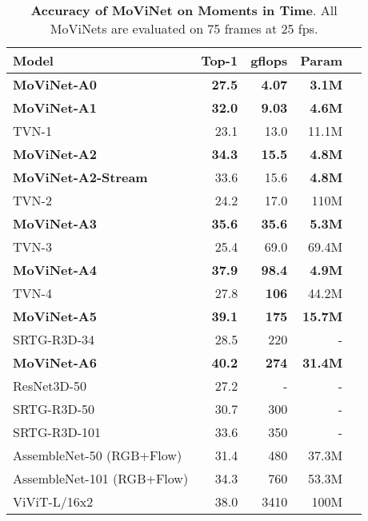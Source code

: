 \documentclass[final]{cvpr}
\newcommand{\ournet}{MoViNet\xspace} \newcommand{\ournets}{\ournet{}s\xspace}
\begin{document}
\begin{table}[tbp]
    \footnotesize
    \begin{center}
    \begin{tabularx}{\columnwidth}{@{}Xrrrr@{}}
    \toprule
        \sc Model & \sc Top-1 & \sc gflops & \sc Param \\
    \midrule
        \bf \ournet-A0 & \bf 27.5 & \bf 4.07 & \bf 3.1M \\
    \midrule
        \bf \ournet-A1 & \bf 32.0 & \bf 9.03 & \bf 4.6M \\
        TVN-1 \cite{piergiovanni2020tiny} & 23.1 & 13.0 & 11.1M \\
    \midrule
        \bf \ournet-A2 & \bf 34.3 & \bf 15.5 & \bf 4.8M \\
        \bf \ournet-A2-Stream & 33.6 & 15.6 & \bf 4.8M \\
        TVN-2 \cite{piergiovanni2020tiny} & 24.2 & 17.0 & 110M \\
    \midrule
        \bf \ournet-A3 & \bf 35.6 & \bf 35.6 & \bf 5.3M \\
        TVN-3 \cite{piergiovanni2020tiny} & 25.4 & 69.0 & 69.4M \\
    \midrule
        \bf \ournet-A4 & \bf 37.9 & \bf 98.4 & \bf 4.9M \\
        TVN-4 \cite{piergiovanni2020tiny} & 27.8 & \bf 106 & 44.2M \\
    \midrule
        \bf \ournet-A5 & \bf 39.1 & \bf 175 & \bf 15.7M \\
        SRTG-R3D-34 \cite{stergiou2020learn} & 28.5 & 220 & - \\
    \midrule
        \bf \ournet-A6 & \bf 40.2 & \bf 274 & \bf 31.4M \\
        ResNet3D-50 \cite{ryoo2019assemblenet} & 27.2 & - & - \\
        SRTG-R3D-50 \cite{stergiou2020learn} & 30.7 & 300 & - \\
        SRTG-R3D-101 \cite{stergiou2020learn} & 33.6 & 350 & - \\
        AssembleNet-50 (RGB+Flow) \cite{ryoo2019assemblenet} & 31.4 & 480 & 37.3M \\
        AssembleNet-101 (RGB+Flow) \cite{ryoo2019assemblenet} & 34.3 & 760 & 53.3M \\
        ViViT-L/16x2~\cite{arnab2021vivit} & 38.0 & 3410 & 100M \\
    \bottomrule
    \end{tabularx}
    \end{center}
    \caption{
        {\bf Accuracy of \ournet on Moments in Time}.
        All \ournets are evaluated on 75 frames at 25 fps.
    }
    \label{table:mit-comparison}
\end{table}
\end{document}
